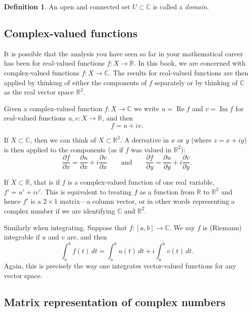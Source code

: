 \documentclass[12pt,openany]{book}
\renewcommand{\Re}{\operatorname{Re}}
\renewcommand{\Im}{\operatorname{Im}}
\newcommand{\C}{{\mathbb{C}}}
\newcommand{\R}{{\mathbb{R}}}
\newcommand{\myindex}[1]{#1\index{#1}}
\theoremstyle{plain}
\theoremstyle{remark}
\theoremstyle{definition}
\newtheorem{defn}[thm]{Definition}
\theoremstyle{exercise}
\theoremstyle{example}
\begin{document}
\begin{defn}
An open and connected set $U \subset \C$ is called a
\emph{\myindex{domain}}.
\end{defn}

\subsection{Complex-valued functions}

It is possible that the analysis you have seen so far in your mathematical
career has been for real-valued functions $f \colon X \to \R$.  In this
book, we are concerned with complex-valued functions $f \colon X \to \C$.
The results for real-valued functions are then applied by thinking of
either the components of $f$ separately or by thinking of $\C$ as the
real vector space $\R^2$.

Given a complex-valued function $f \colon X \to \C$ we write $u = \Re f$
and $v = \Im f$ for real-valued functions $u,v \colon X \to \R$, and then
\begin{equation*}
f = u+iv .
\end{equation*}

If $X \subset \C$, then we can think of $X \subset \R^2$.
A derivative in $x$ or $y$ (where $z=x+iy$) is then applied to the
components (as if $f$ was valued in $\R^2$):
\begin{equation*}
\frac{\partial f}{\partial x} = 
\frac{\partial u}{\partial x} + i
\frac{\partial v}{\partial x}
\qquad\text{and}\qquad
\frac{\partial f}{\partial y} = 
\frac{\partial u}{\partial y} + i
\frac{\partial v}{\partial y} .
\end{equation*}

If $X \subset \R$, that is if $f$ is a complex-valued
function of one real variable, $f' = u' + iv'$.
This is equivalent to treating $f$ as a function from $\R$ to $\R^2$
and hence $f'$ is a $2 \times 1$ matrix---a column vector, or in other words
representing a complex number if we are identifying $\C$ and $\R^2$.

Similarly when integrating.  Suppose that $f \colon [a,b] \to \C$.
We say $f$ is (Riemann) integrable if $u$ and $v$ are, and then
\begin{equation*}
\int_a^b f(t) \, dt = 
\int_a^b u(t) \, dt + i \int_a^b v(t) \, dt .
\end{equation*}
Again, this is precisely the way one integrates vector-valued functions
for any vector space.

\subsection{Matrix representation of complex numbers}
\end{document}
